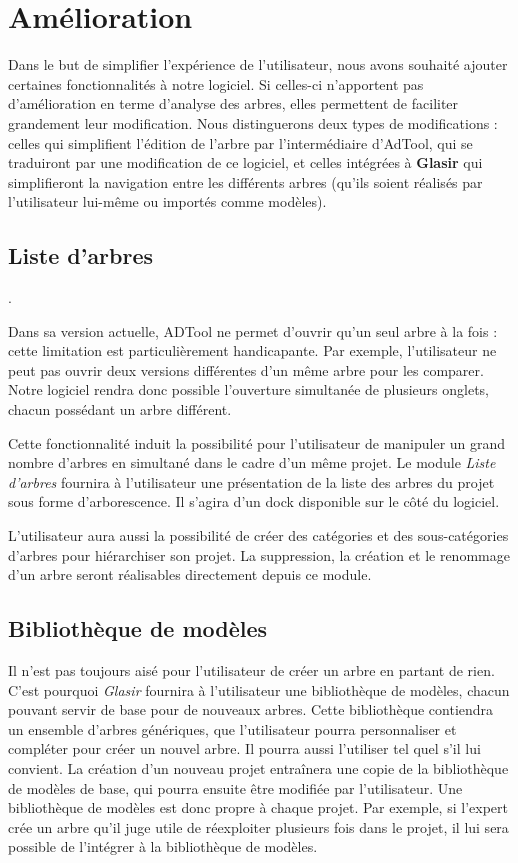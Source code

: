 \section{Amélioration}

	Dans le but de simplifier l'expérience de l'utilisateur, nous avons souhaité ajouter certaines fonctionnalités à notre logiciel. Si celles-ci n'apportent pas d'amélioration en terme d'analyse des arbres, elles permettent de faciliter grandement leur modification. Nous distinguerons deux types de modifications : celles qui simplifient l'édition de l'arbre par l’intermédiaire d'AdTool, qui se traduiront par une modification de ce logiciel, et celles intégrées à \textbf{Glasir} qui simplifieront la navigation entre les différents arbres (qu'ils soient réalisés par l'utilisateur lui-même ou importés comme modèles). 

	\subsection{Liste d'arbres}.

	Dans sa version actuelle, ADTool ne permet d'ouvrir qu'un seul arbre à la fois : cette limitation est particulièrement handicapante. Par exemple, l'utilisateur ne peut pas ouvrir deux versions différentes d'un même arbre pour les comparer. Notre logiciel rendra donc possible l'ouverture simultanée de plusieurs onglets, chacun possédant un arbre différent. 

	Cette fonctionnalité induit la possibilité pour l'utilisateur de manipuler un grand nombre d'arbres en simultané dans le cadre d'un même projet. Le module \emph{Liste d'arbres} fournira à l'utilisateur une présentation de la liste des arbres du projet sous forme d'arborescence. Il s'agira d'un dock disponible sur le côté du logiciel. 

	L'utilisateur aura aussi la possibilité de créer des catégories et des sous-catégories d'arbres pour hiérarchiser son projet. La suppression, la création et le renommage d'un arbre seront réalisables directement depuis ce module.
	
	\subsection{Bibliothèque de modèles}

	Il n'est pas toujours aisé pour l'utilisateur de créer un arbre en partant de rien. C'est pourquoi \emph{Glasir} fournira à l'utilisateur une bibliothèque de modèles, chacun pouvant servir de base pour de nouveaux arbres. Cette bibliothèque contiendra un ensemble d'arbres génériques, que l'utilisateur pourra personnaliser et compléter pour créer un nouvel arbre. Il pourra aussi l'utiliser tel quel s'il lui convient. La création d'un nouveau projet entraînera une copie de la bibliothèque de modèles de base, qui pourra ensuite être modifiée par l'utilisateur. Une bibliothèque de modèles est donc propre à chaque projet. Par exemple, si l'expert crée un arbre qu'il juge utile de réexploiter plusieurs fois dans le projet, il lui sera possible de l'intégrer à la bibliothèque de modèles.

